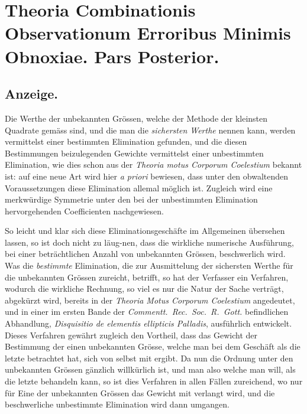 \documentclass[12pt,a4paper]{article}
\begin{document}
\section*{Theoria Combinationis Observationum Erroribus Minimis Obnoxiae. Pars Posterior.}

\subsection*{Anzeige.}

Die Werthe der unbekannten Gr\"ossen, welche der Methode der kleinsten Quadrate gem\"ass sind, und die man die \textit{sichersten Werthe} nennen kann, werden vermittelst einer bestimmten Elimination gefunden, und die diesen Bestimmungen beizulegenden Gewichte vermittelst einer unbestimmten Elimination, wie dies schon aus der \textit{Theoria motus Corporum Coelestium} bekannt ist: auf eine neue Art wird hier \textit{a priori} bewiesen, dass unter den obwaltenden Voraussetzungen diese Elimination allemal m\"oglich ist. Zugleich wird eine merkw\"urdige Symmetrie unter den bei der unbestimmten Elimination hervorgehenden Coefficienten nachgewiesen.

So leicht und klar sich diese Eliminationsgesch\"afte im Allgemeinen \"ubersehen lassen, so ist doch nicht zu l\"aug-nen, dass die wirkliche numerische Ausf\"uhrung, bei einer betr\"achtlichen Anzahl von unbekannten Gr\"ossen, beschwerlich wird. Was die \textit{bestimmte} Elimination, die zur Ausmittelung der sichersten Werthe f\"ur die unbekannten Gr\"ossen zureicht, betrifft, so hat der Verfasser ein Verfahren, wodurch die wirkliche Rechnung, so viel es nur die Natur der Sache vertr\"agt, abgek\"urzt wird, bereits in der \textit{Theoria Motus Corporum Coelestium} angedeutet, und in einer im ersten Bande der \textit{Commentt.\ Rec.\ Soc.\ R.\ Gott.} befindlichen Abhandlung, \textit{Disquisitio de elementis ellipticis Palladis}, ausf\"uhrlich entwickelt. Dieses Verfahren gew\"ahrt zugleich den Vortheil, dass das Gewicht der Bestimmung der einen unbekannten Gr\"osse, welche man bei dem Gesch\"aft als die letzte betrachtet hat, sich von selbst mit ergibt. Da nun die Ordnung unter den unbekannten Gr\"ossen g\"anzlich willk\"urlich ist, und man also welche man will, als die letzte behandeln kann, so ist dies Verfahren in allen F\"allen zureichend, wo nur f\"ur Eine der unbekannten Gr\"ossen das Gewicht mit verlangt wird, und die beschwerliche unbestimmte Elimination wird dann umgangen.
\end{document}
